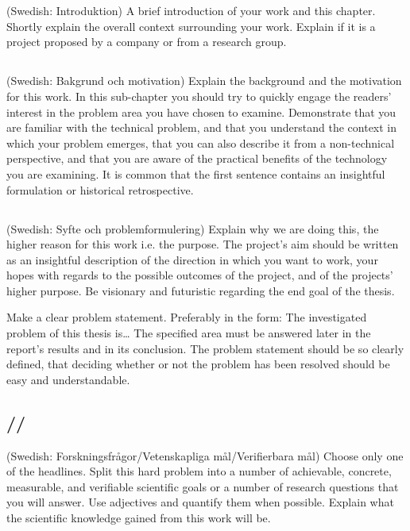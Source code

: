 \section{}\label{sec:intro} 
(Swedish: Introduktion) A brief introduction of your work and this chapter. Shortly explain the overall context surrounding your work. Explain if it is a project proposed by a company or from a research group.

\subsection{}
(Swedish: Bakgrund och motivation) Explain the background and the motivation for this work. In this sub-chapter you should try to quickly engage the readers' interest in the problem area you have chosen to examine. Demonstrate that you are familiar with the technical problem, and that you understand the context in which your problem emerges, that you can also describe it from a non-technical perspective, and that you are aware of the practical benefits of the technology you are examining. It is common that the first sentence contains an insightful formulation or historical retrospective. 

\subsection{}
(Swedish: Syfte och problemformulering) Explain why we are doing this, the higher reason for this work i.e. the purpose. The project's aim should be written as an insightful description of the direction in which you want to work, your hopes with regards to the possible outcomes of the project, and of the projects' higher purpose. Be visionary and futuristic regarding the end goal of the thesis.

Make a clear problem statement. Preferably in the form: The investigated problem of this thesis is… The specified area must be answered later in the report's results and in its conclusion. The problem statement should be so clearly defined, that deciding whether or not the problem has been resolved should be easy and understandable.


\subsection{//}
(Swedish: Forskningsfrågor/Vetenskapliga mål/Verifierbara mål) Choose only one of the headlines. Split this hard problem into a number of achievable, concrete, measurable, and verifiable scientific goals or a number of research questions that you will answer. Use adjectives and quantify them when possible. Explain what the scientific knowledge gained from this work will be.

